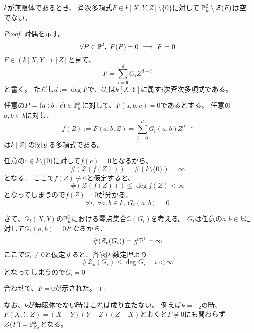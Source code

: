\documentclass[a4paper]{jsarticle}
\begin{document}
    \begin{Lemma}
        $k$が無限体であるとき、
        斉次多項式$F \in k[X,Y,Z] \setminus \{0\}$に対して
        $\mathbb{P}^2_{k} \setminus \mathcal{Z}(F)$は空でない。
    \end{Lemma}
    \begin{proof}
        対偶を示す。
        \[ \forall P \in \mathbb{P}^2,~ F(P)=0 \implies F=0 \]
        $F \in (k[X,Y])[Z]$と見て、
        \[ F=\sum_{i=0}^{d}{G_i Z^{d-i}} \]
        と書く。
        ただし$d:=\deg F$で、$G_i$は$k[X,Y]$に属す$i$次斉次多項式である。

        任意の$P=(a:b:c) \in \mathbb{P}^2_{k}$に対して、$F(a,b,c)=0$であるとする。
        任意の$a,b \in k$に対し、
        \[f(Z):=F(a,b,Z)=\sum_{i=0}^{d}{G_i(a,b) Z^{d-i}}\]
        は$k[Z]$の関する多項式である。

        任意の$c \in k \setminus \{0\}$に対して$f(c)=0$となるから、
        \[ \#(\mathcal{Z}(f(Z)))=\#(k \setminus \{0\})=\infty \]
        となる。
        ここで$f(Z) \neq 0$と仮定すると、
        \[ \#(\mathcal{Z}(f(Z))) \leq \deg f(Z) < \infty \]
        となってしまうので$f(Z)=0$が分かる。
        \[ \forall i,~ \forall a, b \in k,~ G_i(a,b)=0 \]

        さて、$G_i(X,Y)$の$\mathbb{P}^1_{k}$における零点集合$\mathcal{Z}(G_i)$を考える。
        $G_i$は任意の$a,b \in k$に対して$G_i(a,b)=0$となるから、
        \[ \#(\mathcal{Z}_p(G_i))=\# \mathbb{P}^1=\infty \]
        ここで$G_i \neq 0$と仮定すると、斉次因数定理より
        \[ \#\mathcal{Z}_p(G_i) \leq \deg G_i=i< \infty \]
        となってしまうので$G_i=0$

        合わせて、$F=0$が示された。
        
    \end{proof}
    なお、$k$が無限体でない時はこれは成り立たない。
    例えば$k=\mathbb{F}_2$の時、
    $F(X,Y,Z)=(X-Y)(Y-Z)(Z-X)$とおくと$F \neq 0$にも関わらず
    $\mathcal{Z}(F)=\mathbb{P}^2_{\mathbb{F}_2}$となる。
\end{document}
